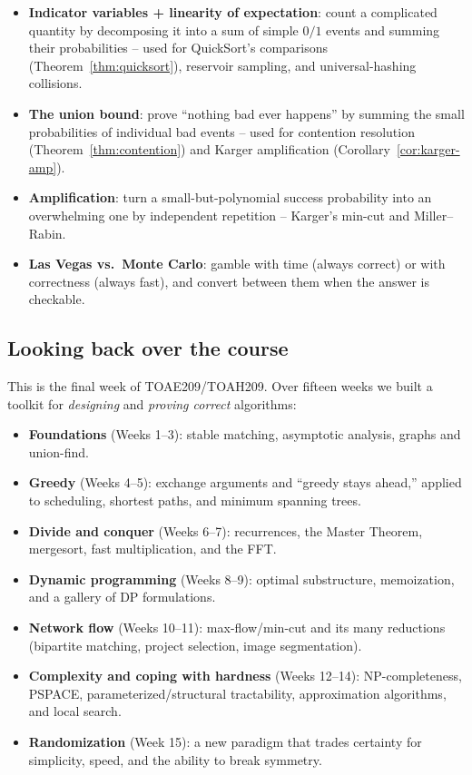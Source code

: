 \documentclass[11pt]{article}
\begin{document}
\begin{itemize}
    \item \textbf{Indicator variables + linearity of expectation}: count a
    complicated quantity by decomposing it into a sum of simple $0/1$ events and
    summing their probabilities -- used for QuickSort's comparisons
    (Theorem~\ref{thm:quicksort}), reservoir sampling, and universal-hashing
    collisions.
    \item \textbf{The union bound}: prove ``nothing bad ever happens'' by summing
    the small probabilities of individual bad events -- used for contention
    resolution (Theorem~\ref{thm:contention}) and Karger amplification
    (Corollary~\ref{cor:karger-amp}).
    \item \textbf{Amplification}: turn a small-but-polynomial success probability
    into an overwhelming one by independent repetition -- Karger's min-cut and
    Miller--Rabin.
    \item \textbf{Las Vegas vs.\ Monte Carlo}: gamble with time (always correct) or
    with correctness (always fast), and convert between them when the answer is
    checkable.
\end{itemize}

\subsection{Looking back over the course}

This is the final week of TOAE209/TOAH209. Over fifteen weeks we built a toolkit
for \emph{designing} and \emph{proving correct} algorithms:

\begin{itemize}
    \item \textbf{Foundations} (Weeks 1--3): stable matching, asymptotic analysis,
    graphs and union-find.
    \item \textbf{Greedy} (Weeks 4--5): exchange arguments and ``greedy stays
    ahead,'' applied to scheduling, shortest paths, and minimum spanning trees.
    \item \textbf{Divide and conquer} (Weeks 6--7): recurrences, the Master
    Theorem, mergesort, fast multiplication, and the FFT.
    \item \textbf{Dynamic programming} (Weeks 8--9): optimal substructure,
    memoization, and a gallery of DP formulations.
    \item \textbf{Network flow} (Weeks 10--11): max-flow/min-cut and its many
    reductions (bipartite matching, project selection, image segmentation).
    \item \textbf{Complexity and coping with hardness} (Weeks 12--14):
    NP-completeness, PSPACE, parameterized/structural tractability, approximation
    algorithms, and local search.
    \item \textbf{Randomization} (Week 15): a new paradigm that trades certainty
    for simplicity, speed, and the ability to break symmetry.
\end{itemize}
\end{document}
